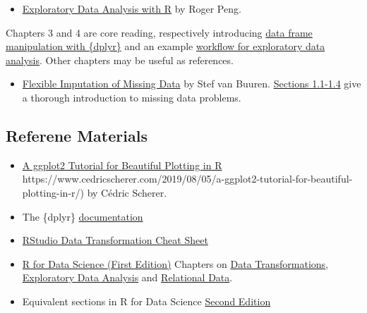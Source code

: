 \documentclass[
  letterpaper,
  DIV=11,
  numbers=noendperiod]{scrreprt}
\providecommand{\tightlist}{%
  \setlength{\itemsep}{0pt}\setlength{\parskip}{0pt}}\usepackage{longtable,booktabs,array}
\begin{document}
\begin{itemize}
\tightlist
\item
  \href{https://bookdown.org/rdpeng/exdata/}{Exploratory Data Analysis
  with R} by Roger Peng.
\end{itemize}

Chapters 3 and 4 are core reading, respectively introducing
\href{https://bookdown.org/rdpeng/exdata/managing-data-frames-with-the-dplyr-package.html}{data
frame manipulation with \{dplyr\}} and an example
\href{https://bookdown.org/rdpeng/exdata/exploratory-data-analysis-checklist.html}{workflow
for exploratory data analysis}. Other chapters may be useful as
references.

\begin{itemize}
\tightlist
\item
  \href{https://stefvanbuuren.name/fimd/}{Flexible Imputation of Missing
  Data} by Stef van Buuren.
  \href{https://stefvanbuuren.name/fimd/ch-introduction.html}{Sections
  1.1-1.4} give a thorough introduction to missing data problems.
\end{itemize}

\subsection*{Referene Materials}\label{referene-materials}

\begin{itemize}
\item
  \href{}{A ggplot2 Tutorial for Beautiful Plotting in R}
  https://www.cedricscherer.com/2019/08/05/a-ggplot2-tutorial-for-beautiful-plotting-in-r/)
  by Cédric Scherer.
\item
  The \{dplyr\} \href{https://dplyr.tidyverse.org/}{documentation}
\item
  \href{https://github.com/rstudio/cheatsheets/blob/main/data-transformation.pdf}{RStudio
  Data Transformation Cheat Sheet}
\item
  \href{https://r4ds.had.co.nz/index.html}{R for Data Science (First
  Edition)} Chapters on
  \href{https://r4ds.had.co.nz/transform.html}{Data Transformations},
  \href{https://r4ds.had.co.nz/exploratory-data-analysis.html}{Exploratory
  Data Analysis} and
  \href{https://r4ds.had.co.nz/relational-data.html}{Relational Data}.
\item
  Equivalent sections in R for Data Science
  \href{https://r4ds.hadley.nz/}{Second Edition}
\end{itemize}
\end{document}
